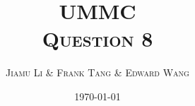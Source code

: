\usepackage{mathtools}
\usepackage{amssymb}
\usepackage{amsthm}
\usepackage{parskip}
\usepackage{cancel}

\usepackage[p]{ETbb}
\usepackage[scaled=.95, type1]{cabin}
\usepackage[T1]{fontenc}
\usepackage[libertine, vvarbb]{newtxmath}
\usepackage{microtype}
\usepackage[sc]{titlesec}

\usepackage{caption}
\usepackage{minted}
\usepackage{FiraMono}
\usepackage[usenames, svgnames, dvipsnames, table]{xcolor}
\usepackage{hyperref}

\usepackage[inline]{asymptote}
\def\asydir{asy}

\usepackage{fancyhdr}
\pagestyle{fancy}
\fancyhf{}
\setlength{\headheight}{25pt}
\fancyhead[R]{\scshape \nouppercase{\leftmark}}
\fancyfoot[C]{\thepage}
\renewcommand{\footrulewidth}{1pt}
\fancypagestyle{plain}{
  \renewcommand{\headrulewidth}{0pt}
  \renewcommand{\footrulewidth}{0pt}
  \fancyhf{}
}

\newtheorem{theorem}{\scshape Theorem}
\newtheorem{problem}{\scshape Question}
\newtheorem{claim}{\scshape Claim}[theorem]
\DeclareMathOperator{\prob}{Pr}

\title{\scshape {\Huge UMMC} \\[1em] Question 8}

\author{\scshape Jiamu Li \& Frank Tang \& Edward Wang}

\date{\scshape \today}

